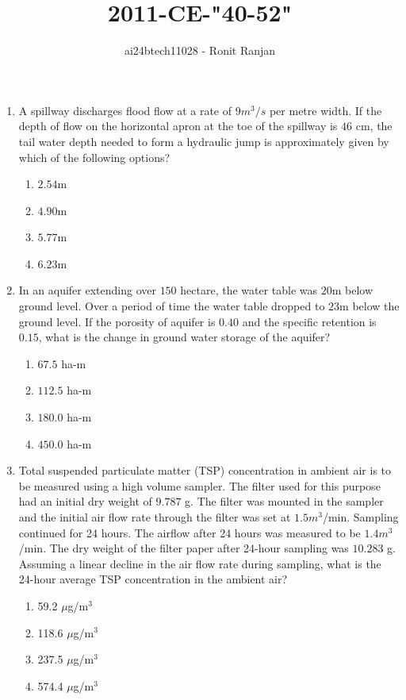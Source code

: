 \documentclass[journal,12pt,onecolumn]{IEEEtran}
\theoremstyle{remark}
\begin{document}

\vspace{3cm}

\title{2011-CE-"40-52"}
\author{ai24btech11028 - Ronit Ranjan}
\maketitle
\bigskip


\begin{enumerate}


    \item A spillway discharges flood flow at a rate of $9 m^3/s$ per metre width. If the depth of flow on the horizontal apron at the toe of the spillway is $46$ cm, the tail water depth needed to form a hydraulic jump is approximately given by which of the following options?
    \begin{enumerate}
        \item $2.54$m
        \item $4.90$m
        \item $5.77$m
        \item $6.23$m
    \end{enumerate}

    \item In an aquifer extending over $150$ hectare, the water table was $20$m below ground level. Over a period of time the water table dropped to $23$m below the ground level. If the porosity of aquifer is $0.40$ and the specific retention is $0.15$, what is the change in ground water storage of the aquifer?
    \begin{enumerate}
        \item $67.5$ ha-m
        \item $112.5$ ha-m
        \item $180.0$ ha-m
        \item $450.0$ ha-m
    \end{enumerate}

    \item Total suspended particulate matter (TSP) concentration in ambient air is to be measured using a high volume sampler. The filter used for this purpose had an initial dry weight of $9.787$ g. The filter was mounted in the sampler and the initial air flow rate through the filter was set at $1.5 m^3$/min. Sampling continued for 24 hours. The airflow after 24 hours was measured to be $1.4 m^3$/min. The dry weight of the filter paper after 24-hour sampling was $10.283$ g. Assuming a linear decline in the air flow rate during sampling, what is the 24-hour average TSP concentration in the ambient air?
    \begin{enumerate}
        \item 59.2 $\mu$g/m$^3$
        \item 118.6 $\mu$g/m$^3$
        \item 237.5 $\mu$g/m$^3$
        \item 574.4 $\mu$g/m$^3$
    \end{enumerate}


\end{enumerate}
\end{document}
